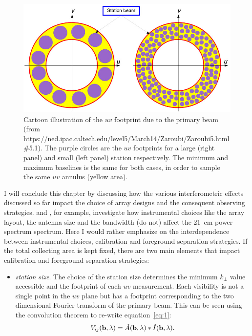 {\begin{figure}[]
\begin{center}
\includegraphics[width=1.\textwidth]{Bernardi/uv_footprint}
\end{center}
\caption{Cartoon illustration of the $uv$ footprint due to the primary beam (from https://ned.ipac.caltech.edu/level5/March14/Zaroubi/Zaroubi5.html\#5.1). The purple circles are the $uv$ footprints for a large (right panel) and small (left panel) station respectively. The minimum and maximum baselines is the same for both cases, in order to sample the same $uv$ annulus (yellow area).}
\label{fig:fig6}
\end{figure}
I will conclude this chapter by discussing how the various interferometric effects discussed so far impact the choice of array designs and the consequent observing strategies. \cite{morales05} and \cite{parsons12b}, for example, investigate how instrumental choices like the array layout, the antenna size and the bandwidth (do not) affect the 21~cm power spectrum spectrum. Here I would rather emphasize on the interdependence between instrumental choices, calibration and foreground separation strategies. If the total collecting area is kept fixed, there are two main elements that impact calibration and foreground separation strategies:
\begin{itemize}
\item {\it station size}. The choice of the station size determines the minimum $k_\perp$ value accessible and the footprint of each $uv$ measurement. Each visibility is not a single point in the $uv$ plane but has a footprint corresponding to the two dimensional Fourier transform of the primary beam. This can be seen using the convolution theorem to re-write equation~\ref{eq:1}: \begin{equation}
V_{ij} ({\bf b}, \lambda) = \tilde{A} ({\bf b}, \lambda) \ast \tilde{I} ({\bf b}, \lambda).

\end{equation}
\end{itemize}}
